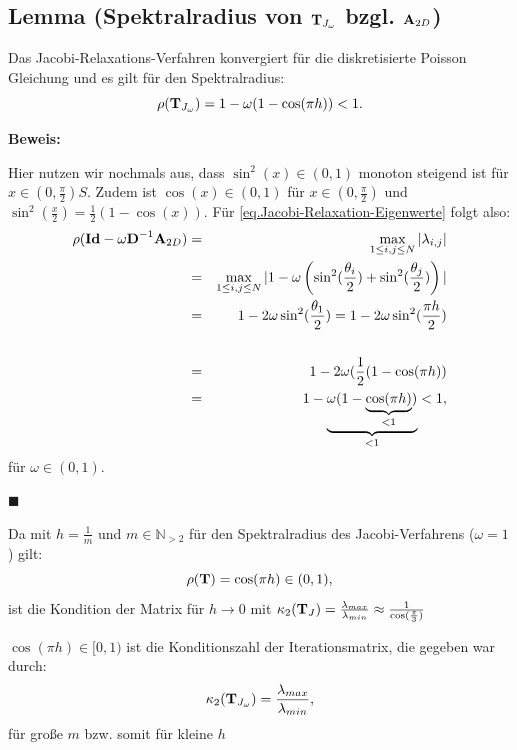 \subsection{Lemma (Spektralradius von ${\textbf{T}}_{J_{\omega}}$ bzgl. ${\textbf{A}}_{2D}$)}\label{ss.Spektralradius Jacobi Relax}

Das Jacobi-Relaxations-Verfahren konvergiert für die diskretisierte Poisson Gleichung und es gilt für den Spektralradius:
\begin{equation}
\rho({\textbf{T}}_{J_{\omega}}) = 1 - \omega(1 - \cos (\pi h)) < 1.
\end{equation}

\textbf{Beweis:}\label{b.Spektral JacobiRelax}

Hier nutzen wir nochmals aus, dass $\sin^{2}(x) \in (0,1)$ monoton steigend ist für $x \in (0, \frac{\pi}{2})S$. Zudem ist $\cos(x) \in (0,1)$ für $x \in (0,\frac{\pi}{2})$ und $\sin^{2}(\frac{x}{2}) = \frac{1}{2} (1 - \cos(x))$.
Für \autoref{eq.Jacobi-Relaxation-Eigenwerte} folgt also:
\begin{eqnarray}
\rho({\textbf{Id}}-\omega{\textbf{D}}^{-1}{\textbf{A}}_{2D}) &=& \max_{1 \le i,j \le N} | \lambda_{i,j} | \notag \\
&=& \max_{1 \le i,j \le N} | 1 - \omega \left(\sin^{2}(\frac {\theta_{i}} {2}) + \sin^{2}(\frac {\theta_{j}} {2}) \right) | \notag \\
&=& 1 - 2 \omega \sin^{2} (\frac {\theta_{1}} {2}) = 1 - 2 \omega \sin^{2} (\frac {\pi h} {2}) \notag \\ \notag \\
&=& 1 - 2 \omega (\frac{1} {2} (1 - \cos (\pi h)) \notag \\
&=& 1 - \underbrace{\omega(1 - \underbrace{\cos (\pi h)}_{< 1})}_{< 1} < 1, \notag
\end{eqnarray}
für $\omega \in (0,1)$.
\begin{flushright}
$\blacksquare$
\end{flushright}

Da mit $h = \frac{1}{m}$ und $m \in \mathbb{N}_{>2}$ für den Spektralradius des Jacobi-Verfahrens ($\omega = 1$) gilt:
\begin{equation}
  \rho({\textbf{T}}) = \cos(\pi h) \in (0,1),
\end{equation}
ist die Kondition der Matrix für $h \longrightarrow 0$ mit $\kappa_{2}({\textbf{T}}_{J}) = \frac{\lambda_{max}}{\lambda_{min}} \approx \frac{1}{\cos(\frac{\pi}{3})}$

 $\cos(\pi h) \in [0,1)$ ist die Konditionszahl der Iterationsmatrix, die gegeben war durch:
\begin{equation}
  \kappa_{2}({\textbf{T}}_{J_{\omega}}) = \frac{\lambda_{max}}{\lambda_{min}},
\end{equation}
für große $m$ bzw. somit für kleine $h$

